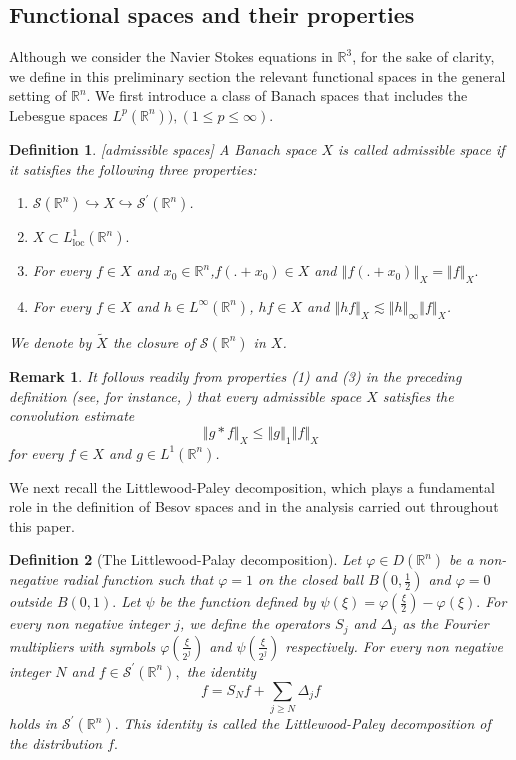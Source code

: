 \documentclass[11pt]{amsart}%
\theoremstyle{plain}
\numberwithin{equation}{section}
\newtheorem{definition}{Definition}[section]
\newtheorem{remark}{Remark}[section]
\begin{document}
\subsection{Functional spaces and their properties}
Although we consider the Navier Stokes equations in $\mathbb{R}^3$, for the sake of clarity, we define in this preliminary section the relevant functional spaces in the general setting of $\mathbb{R}^n$. We first introduce a class of Banach spaces that includes the Lebesgue spaces $L^p(\mathbb{R}^n)), (1\leq p\leq\infty)$.
\begin{definition}\label{reg} [admissible spaces]
A Banach space $X$ is called admissible space if it satisfies the following three
properties:
\begin{enumerate}
\item $\mathcal{S}(\mathbb{R}^{n})\hookrightarrow X\hookrightarrow \mathcal{S}^\prime(\mathbb{R}^{n})$.
\item $X\subset L^1_{\text{loc}}(%
\mathbb{R}^{n}).$
\item For every $f\in X$ and $x_0\in \mathbb{R}^{n}$,$f(.+x_0)\in X$ and $\left\Vert f(.+x_0)\right\Vert _{X}=\left\Vert  f\right\Vert _{X}.$
\item For every $f\in X$ and $h\in L^\infty(\mathbb{R}^{n})$, $hf\in X$ and $\left\Vert hf\right\Vert _{X}\lesssim\left\Vert h\right\Vert
_{\infty }\left\Vert f\right\Vert _{X}$.
\end{enumerate}
We denote by $\tilde{X}$ the  closure of $\mathcal{S}(\mathbb{R}^{n})$ in $X$.
\end{definition}
\begin{remark}
It follows readily from properties (1) and (3) in the preceding definition (see, for instance, \cite[Proposition 4.1]{Lem2}) that every admissible space $X$ satisfies the convolution estimate
  $$ \left\Vert g\ast f\right\Vert _{X}\leq\left\Vert g\right\Vert
_{1 }\left\Vert f\right\Vert _{X}$$
for every $f\in X$ and $g\in L^1(\mathbb{R}^{n})$.
\end{remark}
We next recall the Littlewood-Paley decomposition, which plays a fundamental role in the definition of Besov spaces and in the analysis carried out throughout this paper.
\begin{definition}[The Littlewood-Palay decomposition]
Let $\varphi \in D(\mathbb{R}^{n})$ be a non-negative radial function such that $%
\varphi =1$ on the closed ball $B(0,\frac{1}{2})$ and $\varphi =0$ outside $B(0,1).$ Let $%
\psi $ be the function defined by $\psi (\xi )=\varphi (\frac{\xi }{2}%
)-\varphi (\xi ).$ For every non negative integer $j$, we define the
operators $S_{j}$ and $\Delta _{j}$ as the Fourier multipliers with symbols $\varphi (%
\frac{\xi}{2^{j}})$ and $\psi (\frac{\xi}{2^{j}})$ respectively. For every non
negative integer $N$ and  $f\in \mathcal{S}^{\prime }(\mathbb{R}^{n}),$ the identity%
\[
f=S_{N}f+\sum_{j\geq N}\Delta _{j}f
\]%
holds in $\mathcal{S}^{\prime }(\mathbb{R}^{n}).$ This identity is called the
Littlewood-Paley decomposition of the distribution $f.$
\end{definition}
\end{document}
